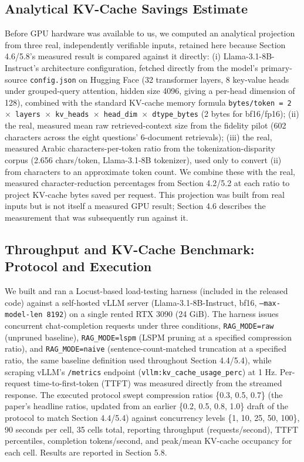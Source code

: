 \subsection{Analytical KV-Cache Savings Estimate}
Before GPU hardware was available to us, we computed an analytical projection from three real, independently verifiable inputs, retained here because Section 4.6/5.8's measured result is compared against it directly: (i) Llama-3.1-8B-Instruct's architecture configuration, fetched directly from the model's primary-source \texttt{config.json} on Hugging Face (32 transformer layers, 8 key-value heads under grouped-query attention, hidden size 4096, giving a per-head dimension of 128), combined with the standard KV-cache memory formula \texttt{bytes/token = 2 $\times$ layers $\times$ kv\_heads $\times$ head\_dim $\times$ dtype\_bytes} (2 bytes for bf16/fp16); (ii) the real, measured mean raw retrieved-context size from the fidelity pilot (602 characters across the eight questions' 6-document retrievals); (iii) the real, measured Arabic characters-per-token ratio from the tokenization-disparity corpus (2.656 chars/token, Llama-3.1-8B tokenizer), used only to convert (ii) from characters to an approximate token count. We combine these with the real, measured character-reduction percentages from Section 4.2/5.2 at each ratio to project KV-cache bytes saved per request. This projection was built from real inputs but is not itself a measured GPU result; Section 4.6 describes the measurement that was subsequently run against it.

\subsection{Throughput and KV-Cache Benchmark: Protocol and Execution}
We built and ran a Locust-based load-testing harness (included in the released code) against a self-hosted vLLM server (Llama-3.1-8B-Instruct, bf16, \texttt{--max-model-len 8192}) on a single rented RTX 3090 (24 GiB). The harness issues concurrent chat-completion requests under three conditions, \texttt{RAG\_MODE=raw} (unpruned baseline), \texttt{RAG\_MODE=lspm} (LSPM pruning at a specified compression ratio), and \texttt{RAG\_MODE=naive} (sentence-count-matched truncation at a specified ratio, the same baseline definition used throughout Section 4.4/5.4), while scraping vLLM's \texttt{/metrics} endpoint (\texttt{vllm:kv\_cache\_usage\_perc}) at 1 Hz. Per-request time-to-first-token (TTFT) was measured directly from the streamed response. The executed protocol swept compression ratios \{0.3, 0.5, 0.7\} (the paper's headline ratios, updated from an earlier \{0.2, 0.5, 0.8, 1.0\} draft of the protocol to match Section 4.4/5.4) against concurrency levels \{1, 10, 25, 50, 100\}, 90 seconds per cell, 35 cells total, reporting throughput (requests/second), TTFT percentiles, completion tokens/second, and peak/mean KV-cache occupancy for each cell. Results are reported in Section 5.8.

